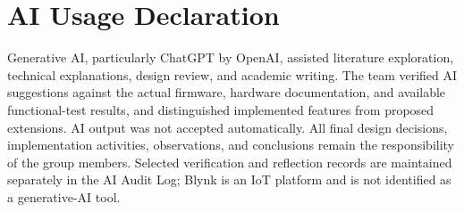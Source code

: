 \documentclass[conference,onecolumn]{IEEEtran}
\begin{document}
\section*{AI Usage Declaration}
Generative AI, particularly ChatGPT by OpenAI, assisted literature exploration, technical explanations, design review, and academic writing. The team verified AI suggestions against the actual firmware, hardware documentation, and available functional-test results, and distinguished implemented features from proposed extensions. AI output was not accepted automatically. All final design decisions, implementation activities, observations, and conclusions remain the responsibility of the group members. Selected verification and reflection records are maintained separately in the AI Audit Log; Blynk is an IoT platform and is not identified as a generative-AI tool.
\end{document}
